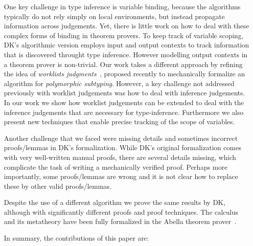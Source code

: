 One key challenge in type inference is variable binding,
because the algorithms typically do not rely simply on local
environments, but instead propagate information across judgements.
Yet, there is little work on how to deal with these complex forms of
binding in theorem provers. To keep track of variable scoping, DK's
algorithmic version employs input and output contexts to track
information that is discovered throught type inference. However
modelling output contexts in a theorem prover is non-trivial. Our
work takes a different approach by refining the idea of
\emph{worklists judgments}~\cite{}, proposed recently to mechanically
formalize an algorithm for \emph{polymorphic subtyping}.
However, a key challenge not addressed previously with
worklist judgements was how to deal with inference judgements.
In our work we show how worklist judgements can be extended to
deal with the inference judgements that are necessary for type-inference.
Furthermore we also present new techniques that enable precise tracking
of the scope of variables.


Another challenge that we faced were missing details and sometimes
incorrect proofs/lemmas in DK's formalization. While DK's original
formalization comes with very well-written manual proofs, there are
several details missing, which complicate the task of writing a
mechanically verified proof. Perhaps more importantly, some
proofs/lemmas are wrong and it is not clear how to replace these by
other valid proofs/lemmas.


Despite the use of a different algorithm we prove the
same results by DK, although with significantly different proofs and
proof techniques. The calculus and its metatheory
have been fully formalized in the Abella theorem prover~\cite{AbellaDesc}. %

In summary, the contributions of this paper are:

